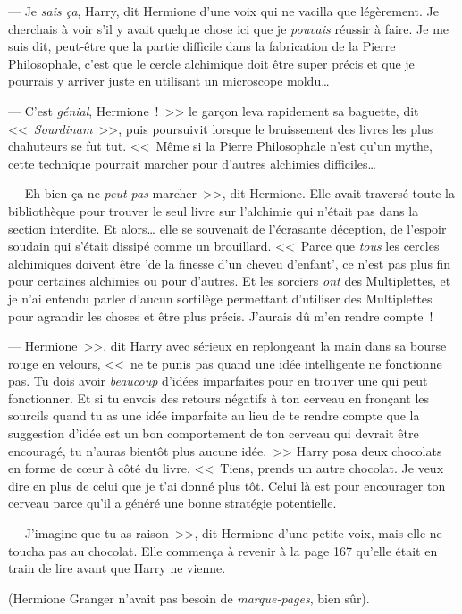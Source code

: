 --- Je \emph{sais ça}, Harry, dit Hermione d'une voix qui ne vacilla que légèrement. Je cherchais à voir s'il y avait quelque chose ici que je \emph{pouvais} réussir à faire. Je me suis dit, peut-être que la partie difficile dans la fabrication de la Pierre Philosophale, c'est que le cercle alchimique doit être super précis et que je pourrais y arriver juste en utilisant un microscope moldu…

--- C'est \emph{génial}, Hermione~!~>> le garçon leva rapidement sa baguette, dit <<~\emph{Sourdinam}~>>, puis poursuivit lorsque le bruissement des livres les plus chahuteurs se fut tut. <<~Même si la Pierre Philosophale n'est qu'un mythe, cette technique pourrait marcher pour d'autres alchimies difficiles…

--- Eh bien ça ne \emph{peut pas} marcher~>>, dit Hermione. Elle avait traversé toute la bibliothèque pour trouver le seul livre sur l'alchimie qui n'était pas dans la section interdite. Et alors… elle se souvenait de l'écrasante déception, de l'espoir soudain qui s'était dissipé comme un brouillard. <<~Parce que \emph{tous} les cercles alchimiques doivent être 'de la finesse d'un cheveu d'enfant', ce n'est pas plus fin pour certaines alchimies ou pour d'autres. Et les sorciers \emph{ont} des Multiplettes, et je n'ai entendu parler d'aucun sortilège permettant d'utiliser des Multiplettes pour agrandir les choses et être plus précis. J'aurais dû m'en rendre compte~!

--- Hermione~>>, dit Harry avec sérieux en replongeant la main dans sa bourse rouge en velours, <<~ne te punis pas quand une idée intelligente ne fonctionne pas. Tu dois avoir \emph{beaucoup} d'idées imparfaites pour en trouver une qui peut fonctionner. Et si tu envois des retours négatifs à ton cerveau en fronçant les sourcils quand tu as une idée imparfaite au lieu de te rendre compte que la suggestion d'idée est un bon comportement de ton cerveau qui devrait être encouragé, tu n'auras bientôt plus aucune idée.~>> Harry posa deux chocolats en forme de cœur à côté du livre. <<~Tiens, prends un autre chocolat. Je veux dire en plus de celui que je t'ai donné plus tôt. Celui là est pour encourager ton cerveau parce qu'il a généré une bonne stratégie potentielle.

--- J'imagine que tu as raison~>>, dit Hermione d'une petite voix, mais elle ne toucha pas au chocolat. Elle commença à revenir à la page 167 qu'elle était en train de lire avant que Harry ne vienne.

(Hermione Granger n'avait pas besoin de \emph{marque-pages}, bien sûr).

